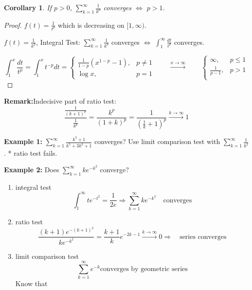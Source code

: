 \documentclass[12pt]{article}
\theoremstyle{plain}
\newtheorem{corollary}{Corollary}[subsection]
\begin{document}
\begin{corollary}
	If $p > 0$, $\sum_{k=1}^{\infty} \frac1{k^p}$ converges $\Leftrightarrow$
	$p > 1$.
\end{corollary}
\begin{proof}
	$f(t) = \frac1{t^p}$ which is decreasing on $[1,\infty)$.
	
	$f(t) = \frac1{k^p}$, Integral Test: $\sum_{k=1}^{\infty} \frac1{k^p}$
	converges $\Leftrightarrow$ $\int_1^{\infty} \frac{dt}{t^p}$ converges. 

	\[
		\int_1^x \frac{dt}{t^p} = \int_1^x t^{-p}dt
		= 
		\begin{cases}
			\frac 1{1-p} (x^{1-p}-1), & p \neq 1	\\
			\log x, & p = 1
		\end{cases}
		\qquad \overset{x\to\infty}{\longrightarrow} \qquad 
		\begin{cases}
			 \infty, & p\leq 1	\\
			 \frac1{p-1}, & p>1	\\
		\end{cases}
	\]
\end{proof}
{\color{Orchid}
\textbf{Remark:}Indecisive part of ratio test: 
\[
	\frac{\frac{1}{(k+1)^p}}{\frac 1{k^p}}
	=\frac{k^p}{(1+k)^p} = \frac1{(\frac 1k+1)^p}  
	\overset{k\to\infty}{\longrightarrow} 1
\]
}

{\color{Brown}
	\textbf{Example 1:}
	$\sum_{k=1}^{\infty} \frac{k^3+1}{k^5+3k^3+1}$ converges? 
	Use limit comparison test with $\sum_{k=1}^{\infty} \frac1{k^2}$.
	* ratio test fails. 
	
	\textbf{Example 2:}
	Does $\sum_{k=1}^{\infty} ke^{-k^2}$ converge? 
	\begin{enumerate}
		\item integral test
			\[
				\int_1^{\infty} te^{-t^2} = \frac 1{2e} \Rightarrow
				\sum_{k=1}^{\infty} ke^{-k^2} \quad \text{converges}
			\]
		\item ratio test
			\[
				\frac{(k+1)e^{-(k+1)^2}}{ke^{-k^2}} 
				= \frac{k+1}k e^{-2k-1} \overset{k\to\infty}{\longrightarrow}0
				\Rightarrow \quad \text{series converges} 
			\]
		\item limit comparison test
			\[
				\sum_{k=1}^{\infty} e^{-k} \text{converges by geometric series}
			\]
			Know that 
	\end{enumerate}
}
\newpage
\end{document}
